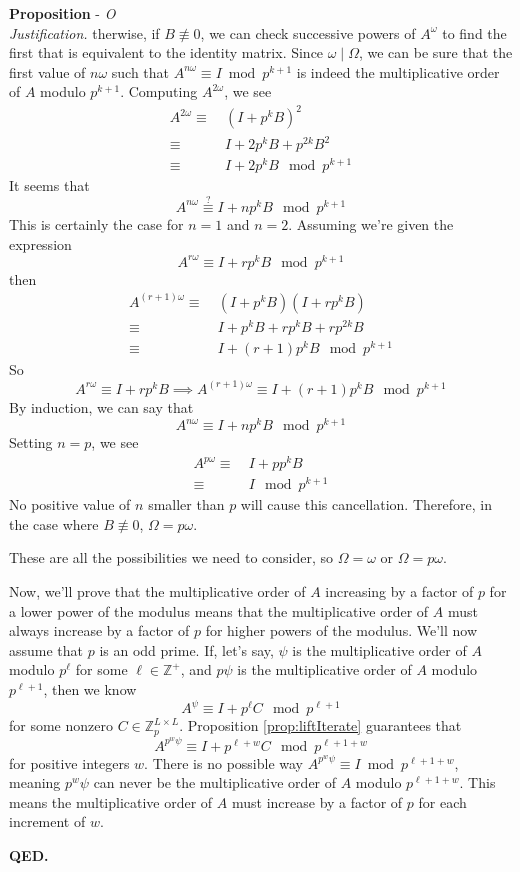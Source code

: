 \documentclass[a4paper, 12pt, reqno]{amsart}
\newcounter{propcounter}
\newenvironment{proposition}[1]
{
	\refstepcounter{propcounter}
	\textbf{Proposition \thepropcounter} - \emph{#1} \\
	\emph{Justification.}
}
{
	\textbf{QED.} \\
}
\begin{document}
\begin{proposition}
			Otherwise, if $B \not\equiv 0$, we can check successive powers of $A^\omega$ to find the first that is equivalent to the identity matrix. Since 
			$\omega \mid \Omega$, we can be sure that the first value of $n\omega$ such that $A^{n\omega} \equiv I \bmod{p^{k+1}}$ is indeed the multiplicative order of $A$
			modulo $p^{k+1}$. Computing $A^{2\omega}$, we see
			\begin{align*}
				A^{2\omega} \equiv& \ (I + p^kB)^2 \\
				            \equiv& \ I + 2p^kB + p^{2k}B^2 \\
							\equiv& \ I + 2p^kB \mod{p^{k+1}}
			\end{align*}
			It seems that
			\[
				A^{n\omega} \overset{?}{\equiv} I + np^kB \mod{p^{k+1}}
			\]
			This is certainly the case for $n=1$ and $n=2$. Assuming we're given the expression
			\[
				A^{r\omega} \equiv I + rp^kB \mod{p^{k+1}}
			\]
			then
			\begin{align*}
				A^{(r+1)\omega} \equiv& \ (I + p^kB)(I + rp^kB) \\
				                \equiv& \ I + p^kB + rp^kB + rp^{2k}B \\
								\equiv& \ I + (r+1)p^kB \mod{p^{k+1}}
			\end{align*}
			So
			\[
				A^{r\omega} \equiv I + rp^kB \implies A^{(r+1)\omega} \equiv I + (r+1)p^kB \mod{p^{k+1}}
			\]
			By induction, we can say that
			\[
				A^{n\omega} \equiv I + np^kB \mod{p^{k+1}}
			\]
			Setting $n=p$, we see
			\begin{align*}
				A^{p\omega} \equiv& \ I + pp^kB \\
							\equiv& \ I \mod{p^{k+1}}
			\end{align*}
			No positive value of $n$ smaller than $p$ will cause this cancellation. Therefore, in the case where $B \not\equiv 0$, $\Omega = p\omega$.
			
			These are all the possibilities we need to consider, so $\Omega = \omega$ or $\Omega = p\omega$.
			
			Now, we'll prove that the multiplicative order of $A$ increasing by a factor of $p$ for a lower power of the modulus means that the multiplicative order of $A$ 
			must always increase by a factor of $p$ for higher powers of the modulus. We'll now assume that $p$ is an odd prime. If, let's say, $\psi$ is the multiplicative 
			order of $A$ modulo $p^\ell$ for some $\ell \in \mathds{Z}^+$, and $p\psi$ is the multiplicative order of $A$ modulo $p^{\ell + 1}$, then we know
			\[
				A^\psi \equiv I + p^\ell C \mod{p^{\ell+1}}
			\]
			for some nonzero $C \in \mathds{Z}_p^{L \times L}$. Proposition \ref{prop:liftIterate} guarantees that
			\[
				A^{p^w\psi} \equiv I + p^{\ell+w}C \mod{p^{\ell+1+w}}
			\]
			for positive integers $w$. There is no possible way $A^{p^w\psi} \equiv I \bmod{p^{\ell+1+w}}$, meaning $p^w\psi$ can never be the multiplicative order of $A$
			modulo $p^{\ell+1+w}$. This means the multiplicative order of $A$ must increase by a factor of $p$ for each increment of $w$.
		\end{proposition}
		
\end{document}
